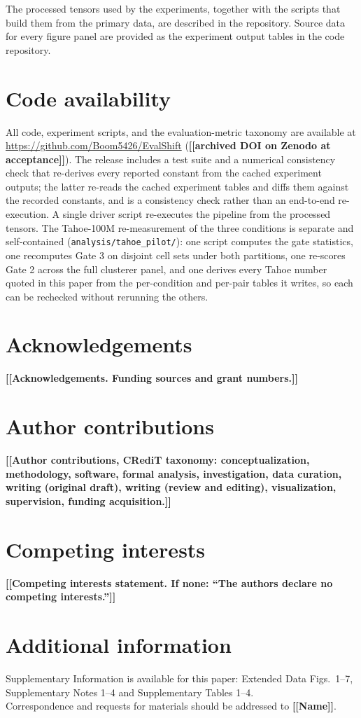 \documentclass[11pt,letterpaper]{article}
\newcommand{\TODO}[1]{{\color{BrickRed}\textbf{[[#1]]}}}
\begin{document}
The processed tensors used by the experiments, together with the scripts that build them from the
primary data, are described in the repository. Source data for every figure panel are provided as
the experiment output tables in the code repository.

\section*{Code availability}

All code, experiment scripts, and the evaluation-metric taxonomy are available at
\url{https://github.com/Boom5426/EvalShift} (\TODO{archived DOI on Zenodo at acceptance}). The
release includes a test suite and a numerical consistency check that re-derives every
reported constant from the cached experiment outputs; the latter re-reads the cached
experiment tables and diffs them against the recorded constants, and is a consistency check
rather than an end-to-end re-execution. A single driver script re-executes the pipeline from the
processed tensors. The Tahoe-100M re-measurement of the three conditions is separate and
self-contained (\texttt{analysis/tahoe\_pilot/}): one script computes the gate statistics, one
recomputes Gate 3 on disjoint cell sets under both partitions, one re-scores Gate 2 across the
full clusterer panel, and one derives every Tahoe number quoted in this paper from the per-condition
and per-pair tables it writes, so each can be rechecked without rerunning the others.

\section*{Acknowledgements}
\TODO{Acknowledgements. Funding sources and grant numbers.}

\section*{Author contributions}
\TODO{Author contributions, CRediT taxonomy: conceptualization, methodology, software,
formal analysis, investigation, data curation, writing (original draft), writing (review and
editing), visualization, supervision, funding acquisition.}

\section*{Competing interests}
\TODO{Competing interests statement. If none: ``The authors declare no competing interests.''}

\section*{Additional information}
\noindent Supplementary Information is available for this paper: Extended Data Figs.\
1--7, Supplementary Notes 1--4 and Supplementary Tables 1--4.\\
Correspondence and requests for materials should be addressed to \TODO{Name}.



\end{document}
